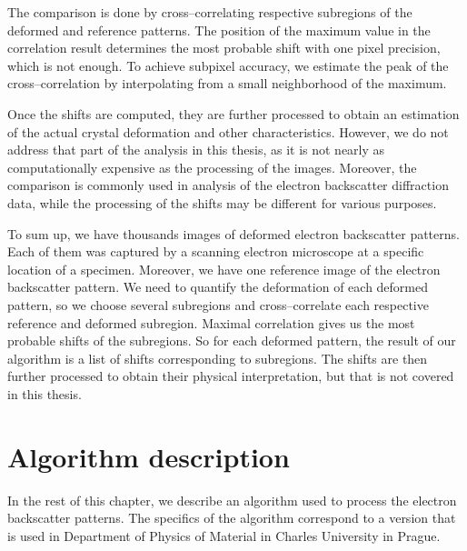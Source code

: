 The comparison is done by cross--correlating respective subregions of the deformed and reference patterns. The position of the maximum value in the correlation result determines the most probable shift with one pixel precision, which is not enough. To achieve subpixel accuracy, we estimate the peak of the cross--correlation by interpolating from a small neighborhood of the maximum.

Once the shifts are computed, they are further processed to obtain an estimation of the actual crystal deformation and other characteristics. However, we do not address that part of the analysis in this thesis, as it is not nearly as computationally expensive as the processing of the images. Moreover, the comparison is commonly used in analysis of the electron backscatter diffraction data, while the processing of the shifts may be different for various purposes.

To sum up, we have thousands images of deformed electron backscatter patterns. Each of them was captured by a scanning electron microscope at a specific location of a specimen. Moreover, we have one reference image of the electron backscatter pattern. We need to quantify the deformation of each deformed pattern, so we choose several subregions and cross--correlate each respective reference and deformed subregion. Maximal correlation gives us the most probable shifts of the subregions. So for each deformed pattern, the result of our algorithm is a list of shifts corresponding to subregions. The shifts are then further processed to obtain their physical interpretation, but that is not covered in this thesis.


\section{Algorithm description}

In the rest of this chapter, we describe an algorithm used to process the electron backscatter patterns. The specifics of the algorithm correspond to a version that is used in Department of Physics of Material in Charles University in Prague.


